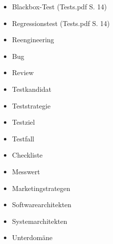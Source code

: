 \begin{itemize}
\item Blackbox-Test (Tests.pdf S. 14)
\item Regressionstest (Tests.pdf S. 14)
\item Reengineering
\item Bug
\item Review
\item Testkandidat
\item Teststrategie
\item Testziel
\item Testfall
\item Checkliste
\item Messwert
\item Marketingstrategen
\item Softwarearchitekten 
\item Systemarchitekten
\item Unterdomäne
\end{itemize}